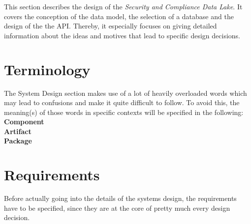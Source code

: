 
This section describes the design of the \textit{Security and Compliance Data Lake}. It covers the conception of the data model, the selection of a database and the design of the the API. Thereby, it especially focuses on giving detailed information about the ideas and motives that lead to specific design decisions.

\section{Terminology}
The System Design section makes use of a lot of heavily overloaded words which may lead to confusions and make it quite difficult to follow. To avoid this, the meaning(s) of those words in specific contexts will be specified in the following: \\

\noindent
\textbf{Component}\\

\noindent
\textbf{Artifact}\\

\noindent
\textbf{Package}
 

\section{Requirements}
Before actually going into the details of the systems design, the requirements have to be specified, since they are at the core of pretty much every design decision. 

